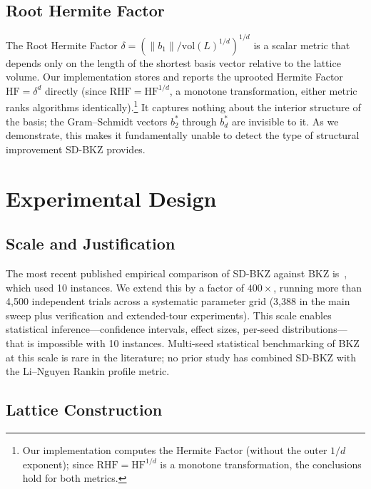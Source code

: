 \documentclass[journal=cic,version=preprint]{iacrj}
\begin{document}
\subsection{Root Hermite Factor}

The Root Hermite Factor $\delta = (\|b_1\| / \mathrm{vol}(L)^{1/d})^{1/d}$ is a scalar metric that depends only on the length of the shortest basis vector relative to the lattice volume. Our implementation stores and reports the uprooted Hermite Factor $\mathrm{HF} = \delta^d$ directly (since $\mathrm{RHF} = \mathrm{HF}^{1/d}$, a monotone transformation, either metric ranks algorithms identically).\footnote{Our implementation computes the Hermite Factor (without the outer $1/d$ exponent); since $\mathrm{RHF} = \mathrm{HF}^{1/d}$ is a monotone transformation, the conclusions hold for both metrics.} It captures nothing about the interior structure of the basis; the Gram--Schmidt vectors $b^*_2$ through $b^*_d$ are invisible to it. As we demonstrate, this makes it fundamentally unable to detect the type of structural improvement SD-BKZ provides.

\section{Experimental Design}
\label{sec:design}

\subsection{Scale and Justification}

The most recent published empirical comparison of SD-BKZ against BKZ is~\cite{EC:MicWal16}, which used 10 instances. We extend this by a factor of $400\times$, running more than 4{,}500 independent trials across a systematic parameter grid (3{,}388 in the main sweep plus verification and extended-tour experiments). This scale enables statistical inference---confidence intervals, effect sizes, per-seed distributions---that is impossible with 10 instances. Multi-seed statistical benchmarking of BKZ at this scale is rare in the literature; no prior study has combined SD-BKZ with the Li--Nguyen Rankin profile metric.

\subsection{Lattice Construction}
\end{document}
